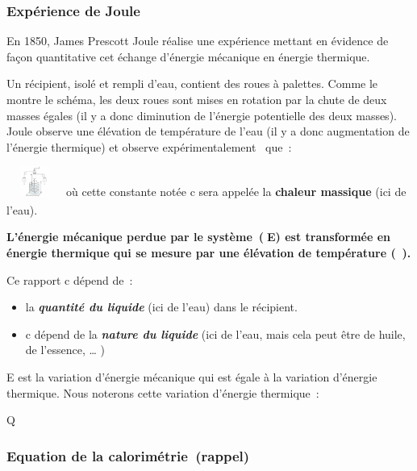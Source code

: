 
\subsubsection{Expérience de Joule}

En 1850, James Prescott Joule réalise une expérience mettant en évidence
de façon quantitative cet échange d'énergie mécanique en énergie
thermique.

Un récipient, isolé et rempli d'eau, contient des roues à palettes.
Comme le montre le schéma, les deux roues sont mises en rotation par la
chute de deux masses égales (il y a donc diminution de l'énergie
potentielle des deux masses). Joule observe une élévation de température
de l'eau (il y a donc augmentation de l'énergie thermique) et observe
expérimentalement ~que~:

\textsubscript{}\includegraphics[width=1.835cm,height=0.989cm]{Pictures/10000001000000E2000000EB005D4F6E603818B5.png}
où cette constante notée c sera appelée la \textbf{chaleur massique}
(ici de l'eau).

\textbf{L'énergie mécanique perdue par le système~(E) est transformée
en énergie thermique qui se mesure par une élévation de température
(). }

Ce rapport c dépend de~:
\begin{itemize}
\item  la \emph{\textbf{quantité du liquide}} (ici de l'eau) dans le
  récipient.
\item  c dépend de la \emph{\textbf{nature du liquide}} (ici de l'eau, mais
  cela peut être de huile, de l'essence, \ldots{} )
\end{itemize}

E est la variation d'énergie mécanique qui est égale à la variation
d'énergie thermique. Nous noterons cette variation d'énergie thermique~:

Q

\subsubsection{Equation de la calorimétrie~(rappel)}

